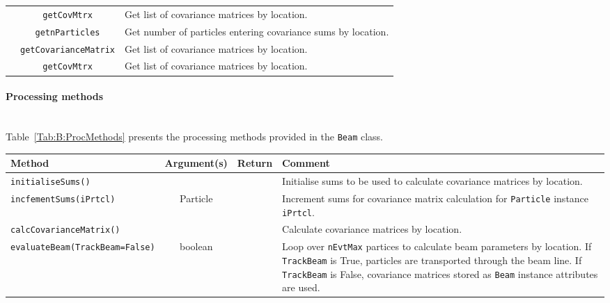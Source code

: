 \begin{sidewaystable}[h]
\begin{center}
\begin{tabular}{|c|c|p{9cm}|}
                                               & \texttt{getCovMtrx}                      & Get list of covariance matrices by location.     \\
                                               & \texttt{getnParticles}                   & Get number of particles entering covariance sums by location. \\
                                               & \texttt{getCovarianceMatrix}             & Get list of covariance matrices by location.     \\
                                               & \texttt{getCovMtrx}                      & Get list of covariance matrices by location.     \\
      \hline
    \end{tabular}
  \end{center}
\end{sidewaystable}

\paragraph{Processing methods}\mbox{}\\
\noindent
Table~\ref{Tab:B:ProcMethods} presents the processing methods provided
in the \texttt{Beam} class.
\begin{sidewaystable}[h]
  \caption{
    Processing methods provided by the \texttt{Beam}
    class. 
  }
  \label{Tab:B:ProcMethods}
  \begin{center}
    \begin{tabular}{|l|c|c|p{10cm}|}
      \hline
      \textbf{Method} & \textbf{Argument(s)} & \textbf{Return} & \textbf{Comment}                                                       \\
      \hline
      \texttt{initialiseSums()}       &                & & Initialise sums to be used to calculate covariance matrices by location.     \\
      \texttt{incfementSums(iPrtcl)}  & Particle       & & Increment sums for covariance matrix calculation for \texttt{Particle}
                                                           instance \texttt{iPrtcl}.                                                    \\
      \texttt{calcCovarianceMatrix()} &                & & Calculate covariance matrices by location.                                   \\
      \texttt{evaluateBeam(TrackBeam=False)} & boolean & & Loop over \texttt{nEvtMax} partices to calculate beam parameters by location.
                                                           If \texttt{TrackBeam} is True, particles are transported through the beam line.
                                                           If \texttt{TrackBeam} is False, covariance matrices stored as \texttt{Beam}
                                                           instance attributes are used.                                                \\
      \hline
    \end{tabular}
  \end{center}
\end{sidewaystable}

